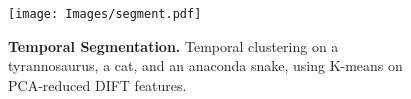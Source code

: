 \begin{figure}
    

    \centering
    
    \texttt{[image: Images/segment.pdf]}
    
    \caption{
        \textbf{Temporal Segmentation.} 
        Temporal clustering on a tyrannosaurus, a cat, and an anaconda snake, using K-means on PCA-reduced DIFT features.
    }
    \label{fig:temoral_seg}
    \Description[]{}  %
\end{figure}

